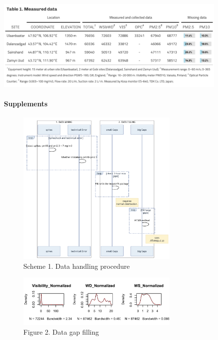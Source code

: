 \documentclass[
  11pt,
]{article}
\begin{document}
\begin{center}\includegraphics[width=4.5in]{images/table_1} \end{center}

\newpage

\paragraph{Supplements}\label{supplements}

\begin{figure}
\centering
\includegraphics[width=3.125in,height=\textheight,keepaspectratio]{images/scheme_1.png}
\caption{Scheme 1. Data handling procedure}
\end{figure}

\newpage

\begin{figure}
\centering
\includegraphics[width=3.125in,height=\textheight,keepaspectratio]{images/figure_2b.png}
\caption{Figure 2. Data gap filling}
\end{figure}
\end{document}
